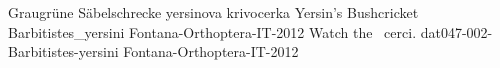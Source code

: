 {Graugr\"une S\"abelschrecke} %
{yersinova krivocerka} %
{Yersin's Bushcricket} %
{Barbitistes_yersini} %
{Fontana-Orthoptera-IT-2012}%
{} %
{\url{}} %
{Watch the \male\male~cerci.} %
{} %
{dat047-002-Barbitistes-yersini} %
{Fontana-Orthoptera-IT-2012}%

